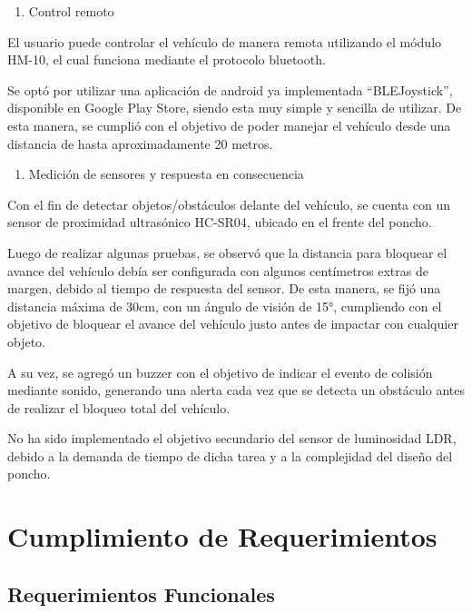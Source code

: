 \begin{enumerate}
\def\labelenumi{\arabic{enumi}.}
\setcounter{enumi}{2}
\tightlist
\item
  Control remoto
\end{enumerate}

El usuario puede controlar el vehículo de manera remota utilizando el
módulo HM-10, el cual funciona mediante el protocolo bluetooth.

Se optó por utilizar una aplicación de android ya implementada
``BLEJoystick'', disponible en Google Play Store, siendo esta muy simple
y sencilla de utilizar. De esta manera, se cumplió con el objetivo de
poder manejar el vehículo desde una distancia de hasta aproximadamente
20 metros.

\begin{enumerate}
\def\labelenumi{\arabic{enumi}.}
\setcounter{enumi}{3}
\tightlist
\item
  Medición de sensores y respuesta en consecuencia
\end{enumerate}

Con el fin de detectar objetos/obstáculos delante del vehículo, se
cuenta con un sensor de proximidad ultrasónico HC-SR04, ubicado en el
frente del poncho.

Luego de realizar algunas pruebas, se observó que la distancia para
bloquear el avance del vehículo debía ser configurada con algunos
centímetros extras de margen, debido al tiempo de respuesta del sensor.
De esta manera, se fijó una distancia máxima de 30cm, con un ángulo de
visión de 15°, cumpliendo con el objetivo de bloquear el avance del
vehículo justo antes de impactar con cualquier objeto.

A su vez, se agregó un buzzer con el objetivo de indicar el evento de
colisión mediante sonido, generando una alerta cada vez que se detecta
un obstáculo antes de realizar el bloqueo total del vehículo.

No ha sido implementado el objetivo secundario del sensor de luminosidad
LDR, debido a la demanda de tiempo de dicha tarea y a la complejidad del
diseño del poncho.

\section{Cumplimiento de Requerimientos}

\subsection{Requerimientos Funcionales}

